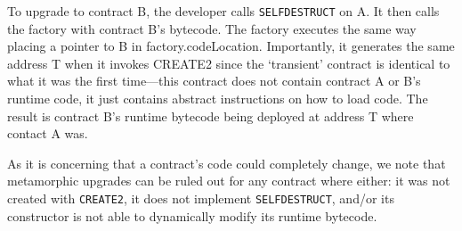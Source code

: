 To upgrade to contract B, the developer calls \texttt{SELFDESTRUCT} on A. It then calls the factory with contract B's bytecode. The factory executes the same way placing a pointer to B in factory.codeLocation. Importantly, it generates the same address T when it invokes CREATE2 since the `transient' contract is identical to what it was the first time---this contract does not contain contract A or B's runtime code, it just contains abstract instructions on how to load code. The result is contract B's runtime bytecode being deployed at address T where contact A was. 
 

As it is concerning that a contract's code could completely change, we note that metamorphic upgrades can be ruled out for any contract where either: it was not created with \texttt{CREATE2}, it does not implement \texttt{SELFDESTRUCT}, and/or its constructor is not able to dynamically modify its runtime bytecode. 



